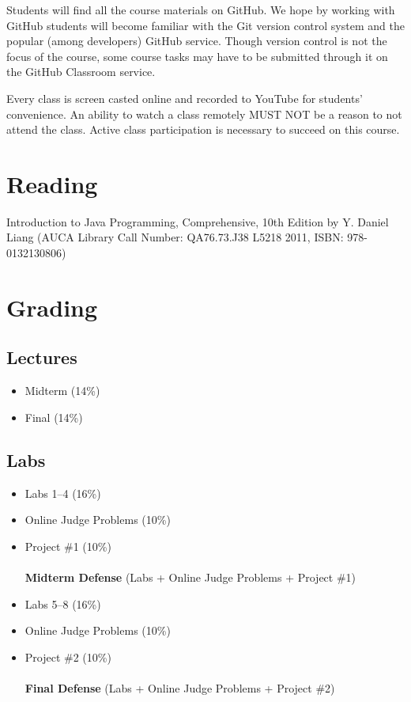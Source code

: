 \documentclass[12pt,a4paper,oneside]{article}
\begin{document}
        Students will find all the course materials on GitHub. We hope by
        working with GitHub students will become familiar with the Git version
        control system and the popular (among developers) GitHub service. Though
        version control is not the focus of the course, some course tasks may
        have to be submitted through it on the GitHub Classroom service.

        Every class is screen casted online and recorded to YouTube for
        students’ convenience. An ability to watch a class remotely MUST NOT
        be a reason to not attend the class. Active class participation is
        necessary to succeed on this course.

    \section{Reading}

        Introduction to Java Programming, Comprehensive, 10th Edition by Y.
        Daniel Liang (AUCA Library Call Number: QA76.73.J38 L5218 2011, ISBN:
        978-0132130806)

    \section{Grading}

        \subsection{Lectures}

            \begin{itemize}
                \item Midterm (14\%)
                \item Final (14\%)
            \end{itemize}

        \subsection{Labs}

            \begin{itemize}
                \item Labs 1--4 (16\%)
                \item Online Judge Problems (10\%)
                \item Project \#1 (10\%)\\\\
                    \textbf{Midterm Defense} (Labs + Online Judge Problems + Project \#1)\\
                \item Labs 5--8 (16\%)
                \item Online Judge Problems (10\%)
                \item Project \#2 (10\%)\\\\
                    \textbf{Final Defense} (Labs + Online Judge Problems + Project \#2)\\
            \end{itemize}
\end{document}
